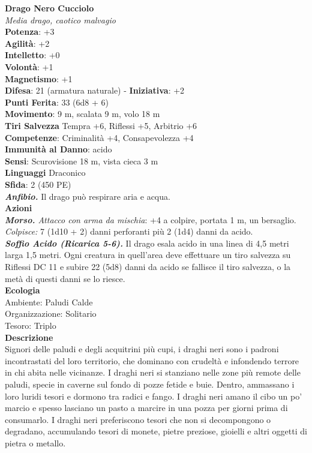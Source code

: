 \begin{multicols}{2}
\medskip\textbf{Drago Nero Cucciolo}\\
\emph{Media drago, caotico malvagio}\\
\textbf{Potenza}: +3\\
\textbf{Agilità}: +2\\
\textbf{Intelletto}: +0\\
\textbf{Volontà}: +1\\
\textbf{Magnetismo}: +1\\
\textbf{Difesa}: 21 (armatura naturale) - \textbf{Iniziativa}: +2\\
\textbf{Punti Ferita}: 33 (6d8 + 6)\\
\textbf{Movimento}: 9 m, scalata 9 m, volo 18 m\\
\textbf{Tiri Salvezza} Tempra +6, Riflessi +5, Arbitrio +6\\
\textbf{Competenze}: Criminalità +4, Consapevolezza +4\\
\textbf{Immunità al Danno}: acido\\
\textbf{Sensi}: Scurovisione 18 m, vista cieca 3 m\\
\textbf{Linguaggi} Draconico\\
\textbf{Sfida}: 2 (450 PE)\smallskip\\
\emph{\textbf{Anfibio.}} Il drago può respirare aria e acqua.\\
\smallskip\textbf{Azioni}\\
\emph{\textbf{Morso.} Attacco con arma da mischia}: +4 a colpire, portata 1 m, un bersaglio.\\
\emph{Colpisce:} 7 (1d10 + 2) danni perforanti più 2 (1d4) danni da acido.\\
\emph{\textbf{Soffio Acido (Ricarica 5-6).}} Il drago esala acido in una linea di 4,5 metri larga 1,5 metri. Ogni creatura in quell'area deve effettuare un tiro salvezza su Riflessi DC 11 e subire 22 (5d8) danni da acido se fallisce il tiro salvezza, o la metà di questi danni se lo riesce.\\
\textbf{Ecologia}\\
Ambiente: Paludi Calde\\
Organizzazione: Solitario\\
Tesoro: Triplo\\
\textbf{Descrizione}\\
Signori delle paludi e degli acquitrini più cupi, i draghi neri sono i padroni incontrastati del loro territorio, che dominano con crudeltà e infondendo terrore in chi abita nelle vicinanze. I draghi neri si stanziano nelle zone più remote delle paludi, specie in caverne sul fondo di pozze fetide e buie. Dentro, ammassano i loro luridi tesori e dormono tra radici e fango. I draghi neri amano il cibo un po’ marcio e spesso lasciano un pasto a marcire in una pozza per giorni prima di consumarlo. I draghi neri preferiscono tesori che non si decompongono o degradano, accumulando tesori di monete, pietre preziose, gioielli e altri oggetti di pietra o metallo.\\


\end{multicols}
